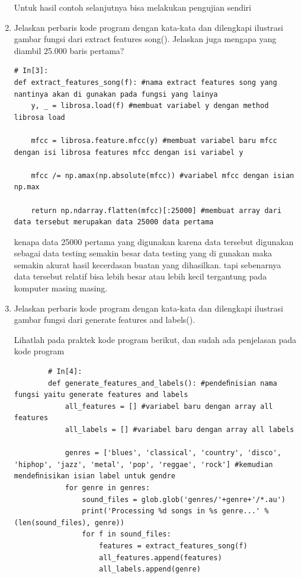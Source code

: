 \begin{enumerate}
		\subitem Untuk hasil contoh selanjutnya bisa melakukan pengujian sendiri

		\item Jelaskan perbaris kode program dengan kata-kata dan dilengkapi ilustrasi gambar fungsi dari extract features song(). Jelaskan juga mengapa yang diambil 25.000 baris pertama?

\begin{verbatim}
# In[3]:
def extract_features_song(f): #nama extract features song yang nantinya akan di gunakan pada fungsi yang lainya
    y, _ = librosa.load(f) #membuat variabel y dengan method librosa load

    mfcc = librosa.feature.mfcc(y) #membuat variabel baru mfcc dengan isi librosa features mfcc dengan isi variabel y

    mfcc /= np.amax(np.absolute(mfcc)) #variabel mfcc dengan isian np.max

    return np.ndarray.flatten(mfcc)[:25000] #membuat array dari data tersebut merupakan data 25000 data pertama
\end{verbatim}

		\par kenapa data 25000 pertama yang digunakan karena data tersebut digunakan sebagai data testing semakin besar data testing yang di gunakan maka semakin akurat hasil kecerdasan buatan yang dihasilkan. tapi sebenarnya data tersebut relatif bisa lebih besar atau lebih kecil tergantung pada komputer masing masing.

		\item Jelaskan perbaris kode program dengan kata-kata dan dilengkapi ilustrasi gambar fungsi dari generate features and labels().
		\par Lihatlah pada praktek kode program berikut, dan sudah ada penjelasan pada kode program 
		\begin{verbatim}
		# In[4]:
		def generate_features_and_labels(): #pendeﬁnisian nama fungsi yaitu generate features and labels
		    all_features = [] #variabel baru dengan array all features
		    all_labels = [] #variabel baru dengan array all labels

		    genres = ['blues', 'classical', 'country', 'disco', 'hiphop', 'jazz', 'metal', 'pop', 'reggae', 'rock'] #kemudian mendeﬁnisikan isian label untuk gendre
		    for genre in genres:
		        sound_files = glob.glob('genres/'+genre+'/*.au')
		        print('Processing %d songs in %s genre...' % (len(sound_files), genre))
		        for f in sound_files:
		            features = extract_features_song(f)
		            all_features.append(features)
		            all_labels.append(genre)


\end{verbatim}
\end{enumerate}
